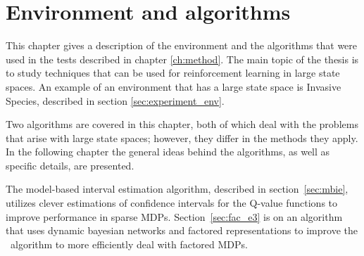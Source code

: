 \chapter{Environment and algorithms}
\label{ch:algo}

This chapter gives a description of the environment and  the algorithms that were used in the
tests described in chapter \ref{ch:method}. The main topic of the thesis is to study techniques that can be used for
reinforcement learning in large state spaces. An example of an environment that has
a large state space is Invasive Species, described in section \ref{sec:experiment_env}. 

Two algorithms are covered in this chapter, both of which deal with the problems that 
arise with large state spaces; however, they differ in the methods they apply. In 
the following chapter the general ideas behind the algorithms, as well as specific details, are
presented. 

The model-based interval estimation algorithm, described in
section~\ref{sec:mbie}, utilizes clever estimations of confidence intervals for
the Q-value functions to improve performance in sparse MDPs.
Section~\ref{sec:fac_e3} is on an algorithm that uses dynamic bayesian networks
and factored representations to improve the \etre\ algorithm to more efficiently deal with factored MDPs. 





